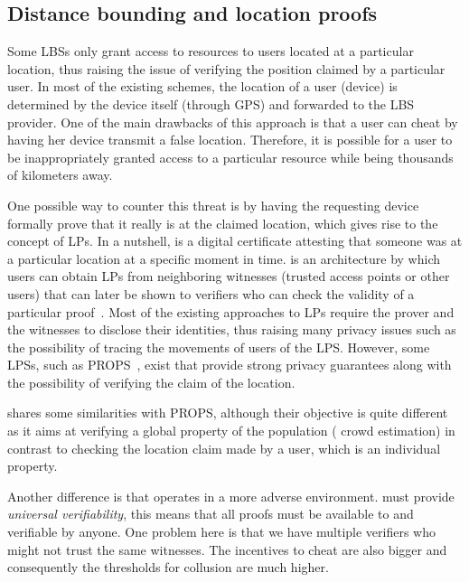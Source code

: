\subsection{Distance bounding and location proofs}
\label{db-and-lp}
Some \acp{LBS} only grant access to resources to users located at a particular 
location, thus raising the issue of verifying the position claimed by a 
particular user.
In most of the existing schemes, the location of a user (device) is determined 
by the device itself (\eg through GPS) and forwarded to the \ac{LBS} provider.
One of the main drawbacks of this approach is that a user can cheat by having 
her device transmit a false location.
Therefore, it is possible for a user to be inappropriately granted access to a 
particular resource while being thousands of kilometers away.

One possible way to counter this threat is by having the requesting device 
formally prove that it really is at the claimed location, which gives rise to 
the concept of \acp{LP}.
In a nutshell,  is a digital certificate attesting that someone was at 
a particular location at a specific moment in time.
 is an architecture by which users can obtain \acp{LP} from 
neighboring witnesses (\eg trusted access points or other users) that can later 
be shown to verifiers who can check the validity of a particular 
proof~\cite{luo2010veriplace,zhu2011applaus}.
Most of the existing approaches to \acp{LP} require the prover and the 
witnesses to disclose their identities, thus raising many privacy issues such 
as the possibility of tracing the movements of users of the \ac{LPS}.
However, some \acp{LPS}, such as PROPS~\cite{PROPS}, exist that provide strong 
privacy guarantees along with the possibility of verifying the claim of the 
location.

\CROCUS shares some similarities with PROPS, although their objective is quite 
different as it aims at verifying a global property of the population (\ie 
crowd estimation) in contrast to checking the location claim made by a user, 
which is an individual property.

Another difference is that \CROCUS operates in a more adverse environment.
\CROCUS must provide \emph{universal verifiability}, this means that all proofs 
must be available to and verifiable by anyone.
One problem here is that we have multiple verifiers who might not trust the 
same witnesses.
The incentives to cheat are also bigger and consequently the thresholds for 
collusion are much higher.

